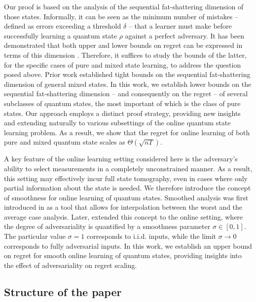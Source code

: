 Our proof is based on the analysis of the sequential fat-shattering dimension of those states. Informally, it can be seen as the minimum number of mistakes -- defined as errors exceeding a threshold $\delta$ -- that a learner must make before successfully learning a quantum state $\rho$ against a perfect adversary. It has been demonstrated that both upper and lower bounds on regret can be expressed in terms of this dimension \citet{rakhlin2015sequential}. Therefore, it suffices to study the bounds of the latter, for the specific cases of pure and mixed state learning, to address the question posed above. Prior work \citep{aaronson2019online} established tight bounds on the sequential fat-shattering dimension of general mixed states. In this work, we establish lower bounds on the sequential fat-shattering dimension -- and consequently on the regret -- of several subclasses of quantum states, the most important of which is the class of pure states. Our approach employs a distinct proof strategy, providing new insights and extending naturally to various subsettings of the online quantum state learning problem. As a result, we show that the regret for online learning of both pure and mixed quantum state scales as $\Theta(\sqrt{nT})$.

A key feature of the online learning setting considered here is the adversary's ability to select measurements in a completely unconstrained manner. As a result, this setting may effectively incur full state tomography, even in cases where only partial information about the state is needed.  We therefore introduce the concept of smoothness for online learning of quantum states. Smoothed analysis was first introduced in \citet{spielman2004} as a tool that allows for interpolation between the worst and the average case analysis. Later, \citet{Haghtalab2024} extended this concept to the online setting, where the degree of adversariality is quantified by a smoothness parameter $\sigma \in [0,1]$. The particular value $\sigma = 1$ corresponds to $\mathrm{i.i.d.}$ inputs, while the limit $\sigma \rightarrow 0$ corresponds to fully adversarial inputs. In this work, we establish an upper bound on regret for smooth online learning of quantum states, providing insights into the effect of adversariality on regret scaling.


\subsection{Structure of the paper}

